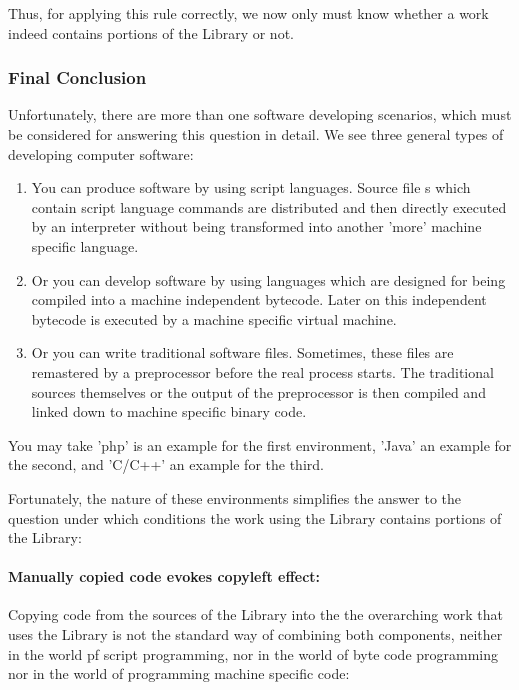 Thus, for applying this rule correctly, we now only must know whether a work
indeed contains portions of the Library or not.

\subsubsection{Final Conclusion}

Unfortunately, there are more than one software developing scenarios, which must
be considered for answering this question in detail. We see three general types
of developing computer software:

\begin{enumerate}
  \item You can produce software by using script languages. Source file s
  which contain script language commands are distributed and then directly
  executed by an interpreter without being transformed into another 'more'
  machine specific language.
  \item Or you can develop software by using languages which are designed for
  being compiled into a machine independent bytecode. Later on this independent
  bytecode is executed by a machine specific virtual machine.
  \item  Or you can write traditional software files. Sometimes, these files are
  remastered by a preprocessor before the real process starts. The traditional
  sources themselves or the output of the preprocessor is then compiled and
  linked down to machine specific binary code.
\end{enumerate}
  
You may take 'php' is an example for the first environment, 'Java' an example
for the second, and 'C/C++' an example for the third.

Fortunately, the nature of these environments simplifies the answer to the
question under which conditions the work using the Library contains portions of
the Library:

\paragraph{Manually copied code evokes copyleft effect:} 


Copying code from the sources of the Library into the the overarching work that
uses the Library is not the standard way of combining both components, neither
in the world pf script programming, nor in the world of byte code programming
nor in the world of programming machine specific code:

